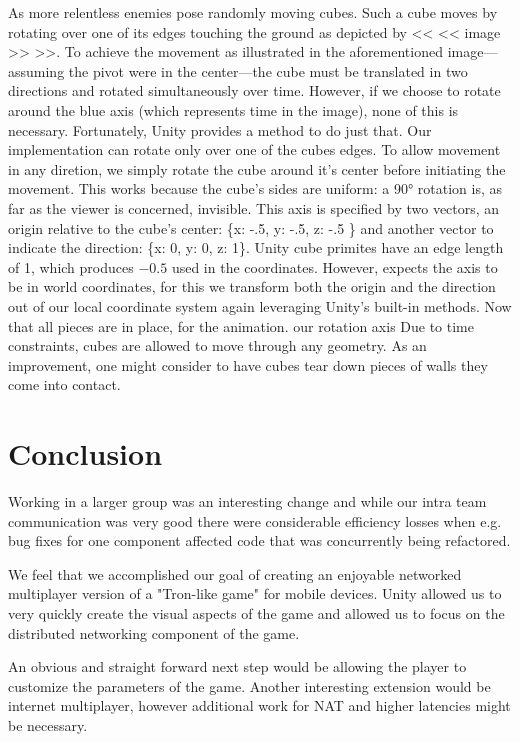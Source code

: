 \documentclass{report}
\begin{document}
As more relentless enemies pose randomly moving cubes. Such a cube moves by rotating over one of its edges touching the ground as depicted by << << image >> >>. To achieve the movement as illustrated in the aforementioned image---assuming the pivot were in the center---the cube must be translated in two directions and rotated simultaneously over time. However, if we choose to rotate around the blue axis (which represents time in the image), none of this is necessary. Fortunately, Unity provides a  method to do just that. Our implementation can rotate only over one of the cubes edges. To allow movement in any diretion, we simply rotate the cube around it's center before initiating the movement. This works because the cube's sides are uniform: a 90° rotation is, as far as the viewer is concerned, invisible. This axis is specified by two vectors, an origin relative to the cube's center: \{x: -.5, y: -.5, z: -.5 \} and another vector to indicate the direction: \{x: 0, y: 0, z: 1\}. Unity cube primites have an edge length of 1, which produces $-0.5$ used in the coordinates. However,  expects the axis to be in world coordinates, for this we transform both the origin and the direction out of our local coordinate system again leveraging Unity's built-in methods. Now that all pieces are in place, for the animation.  our rotation axis Due to time constraints, cubes are allowed to move through any geometry. As an improvement, one might consider to have cubes tear down pieces of walls they come into contact.


\section{Conclusion}
 Working in a larger group was an interesting change and while our intra team communication was very good there were considerable efficiency losses when e.g. bug fixes for one component affected code that was concurrently being refactored.

 We feel that we accomplished our goal of creating an enjoyable  networked multiplayer version of a "Tron-like game" for mobile devices. Unity allowed us to very quickly create the visual aspects of the game and allowed us to focus on the distributed networking component of the game.

An obvious and straight forward next step would be allowing the  player to customize the parameters of the game. Another interesting extension would be internet multiplayer, however additional work for NAT and higher latencies might be necessary.

\balancecolumns %


\end{document}

